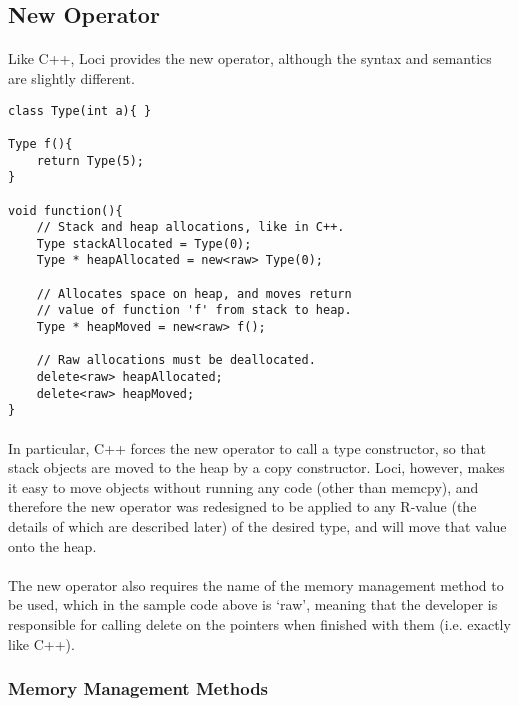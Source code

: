 \documentclass[12pt,twoside,notitlepage]{report}
\begin{document}
\clearpage

\subsection{New Operator}

\paragraph{}
Like C++, Loci provides the new operator, although the syntax and semantics are slightly different.


\begin{lstlisting}
class Type(int a){ }

Type f(){
	return Type(5);
}

void function(){
	// Stack and heap allocations, like in C++.
	Type stackAllocated = Type(0);
	Type * heapAllocated = new<raw> Type(0);
	
	// Allocates space on heap, and moves return
	// value of function 'f' from stack to heap.
	Type * heapMoved = new<raw> f();
	
	// Raw allocations must be deallocated.
	delete<raw> heapAllocated;
	delete<raw> heapMoved;
}
\end{lstlisting}


\paragraph{}
In particular, C++ forces the new operator to call a type constructor, so that stack objects are moved to the heap by a copy constructor. Loci, however, makes it easy to move objects without running any code (other than memcpy), and therefore the new operator was redesigned to be applied to any R-value (the details of which are described later) of the desired type, and will move that value onto the heap.

\paragraph{}
The new operator also requires the name of the memory management method to be used, which in the sample code above is `raw', meaning that the developer is responsible for calling delete on the pointers when finished with them (i.e. exactly like C++).

\clearpage

\subsubsection{Memory Management Methods}
\end{document}
